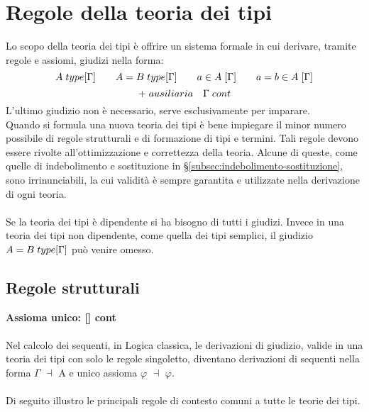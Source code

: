 \chapter{Regole della teoria dei tipi}
\label{cap:regole-teoria-dei-tipi}
Lo scopo della teoria dei tipi \`e offrire un sistema formale in cui derivare, tramite regole e assiomi, giudizi nella forma:
\[ A \hspace{0.1cm} type[\Gamma] \qquad
A = B \hspace{0.1cm} type[\Gamma] \qquad
a \in A\hspace{0.1cm} [\Gamma] \qquad
a=b \in A \hspace{0.1cm}[\Gamma]
\]
\[
+ \hspace{0.1cm} ausiliaria \quad \Gamma \hspace{0.1cm} cont
\]
L'ultimo giudizio non \`e necessario, serve esclusivamente per imparare.\\
Quando si formula una nuova teoria dei tipi \`e bene impiegare il minor numero possibile di regole strutturali e di formazione di tipi e termini. Tali regole devono essere rivolte all'ottimizzazione e correttezza della teoria. Alcune di queste, come quelle di indebolimento e sostituzione in \S\ref{subsec:indebolimento-sostituzione}, sono irrinunciabili, la cui validit\`a \`e sempre garantita e utilizzate nella derivazione di ogni teoria.\\\\
Se la teoria dei tipi \`e dipendente si ha bisogno di tutti i giudizi. Invece in una teoria dei tipi non dipendente, come quella dei tipi semplici, il giudizio $A = B \hspace{0.1cm} type[\Gamma]$ pu\`o venire omesso.\\

\section{Regole strutturali}
\label{sec:regole-strutturali}
\textbf{Assioma unico: [\hspace{0.1cm}] cont}\\\\
Nel calcolo dei sequenti, in Logica classica, le derivazioni di giudizio, valide in una teoria dei tipi con solo le regole singoletto, diventano derivazioni di sequenti nella forma $\Gamma$ $\dashv$ A e unico assioma $\varphi$ $\dashv$ $\varphi$.
\\\\
Di seguito illustro le principali regole di contesto comuni a tutte le teorie dei tipi.
